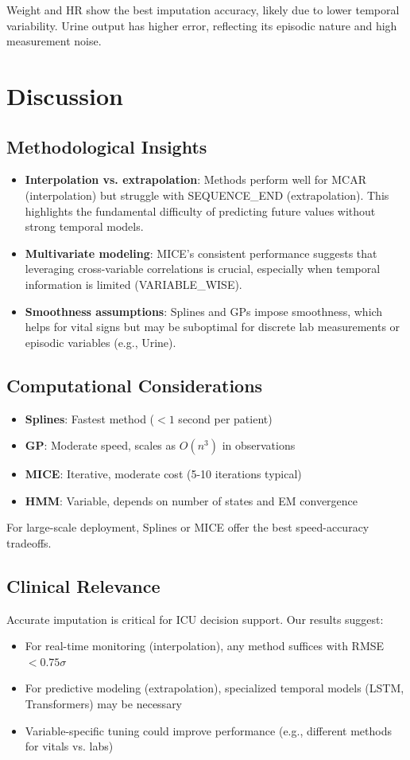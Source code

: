 \documentclass[11pt]{article}
\begin{document}
Weight and HR show the best imputation accuracy, likely due to lower temporal variability. Urine output has higher error, reflecting its episodic nature and high measurement noise.

\section{Discussion}

\subsection{Methodological Insights}
\begin{itemize}[noitemsep]
    \item \textbf{Interpolation vs. extrapolation}: Methods perform well for MCAR (interpolation) but struggle with SEQUENCE\_END (extrapolation). This highlights the fundamental difficulty of predicting future values without strong temporal models.
    \item \textbf{Multivariate modeling}: MICE's consistent performance suggests that leveraging cross-variable correlations is crucial, especially when temporal information is limited (VARIABLE\_WISE).
    \item \textbf{Smoothness assumptions}: Splines and GPs impose smoothness, which helps for vital signs but may be suboptimal for discrete lab measurements or episodic variables (e.g., Urine).
\end{itemize}

\subsection{Computational Considerations}
\begin{itemize}[noitemsep]
    \item \textbf{Splines}: Fastest method ($<1$ second per patient)
    \item \textbf{GP}: Moderate speed, scales as $O(n^3)$ in observations
    \item \textbf{MICE}: Iterative, moderate cost (5-10 iterations typical)
    \item \textbf{HMM}: Variable, depends on number of states and EM convergence
\end{itemize}

For large-scale deployment, Splines or MICE offer the best speed-accuracy tradeoffs.

\subsection{Clinical Relevance}
Accurate imputation is critical for ICU decision support. Our results suggest:
\begin{itemize}[noitemsep]
    \item For real-time monitoring (interpolation), any method suffices with RMSE $< 0.75\sigma$
    \item For predictive modeling (extrapolation), specialized temporal models (LSTM, Transformers) may be necessary
    \item Variable-specific tuning could improve performance (e.g., different methods for vitals vs. labs)
\end{itemize}
\end{document}
